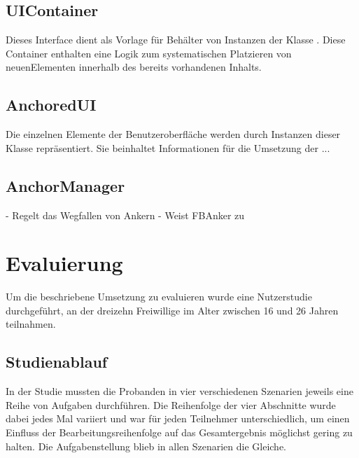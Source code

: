 		\subsection{UIContainer}
			Dieses Interface dient als Vorlage für Behälter von Instanzen der Klasse . \linebreak Diese Container enthalten eine Logik zum systematischen Platzieren von neuen\linebreak Elementen innerhalb des bereits vorhandenen Inhalts.
		
		\subsection{AnchoredUI}
			Die einzelnen Elemente der Benutzeroberfläche werden durch Instanzen dieser Klasse repräsentiert. Sie beinhaltet Informationen für die Umsetzung der ...
		
		\subsection{AnchorManager}
			- Regelt das Wegfallen von Ankern
			- Weist FBAnker zu
			
	\section{Evaluierung}
		Um die beschriebene Umsetzung zu evaluieren wurde eine Nutzerstudie durchgeführt, an der dreizehn Freiwillige im Alter zwischen 16 und 26 Jahren teilnahmen.  
	
		\subsection{Studienablauf}
			In der Studie mussten die Probanden in vier verschiedenen Szenarien jeweils eine Reihe von Aufgaben durchführen. Die Reihenfolge der vier Abschnitte wurde dabei jedes Mal variiert und war für jeden Teilnehmer unterschiedlich, um einen Einfluss der Bearbeitungsreihenfolge auf das Gesamtergebnis möglichst gering zu halten. Die Aufgabenstellung blieb in allen Szenarien die Gleiche.
			
			
						
